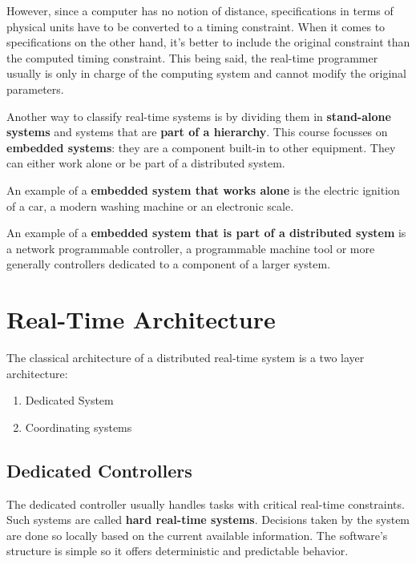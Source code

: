 \documentclass[../main.tex]{subfiles}
\begin{document}
However, since a computer has no notion of distance, specifications in terms of physical units have to be converted to a timing constraint.
When it comes to specifications on the other hand, it's better to include the original constraint than the computed timing constraint.
This being said, the real-time programmer usually is only in charge of the computing system and cannot modify the original parameters.

Another way to classify real-time systems is by dividing them in \textbf{stand-alone systems} and systems that are \textbf{part of a hierarchy}. This course focusses on \textbf{embedded systems}: they are a component built-in to other equipment. They can either work alone or be part of a distributed system.

\begin{exmp}
An example of a \textbf{embedded system that works alone} is the electric ignition of a car, a modern washing machine or an electronic scale.
\end{exmp} 

\begin{exmp}
An example of a \textbf{embedded system that is part of a distributed system} is a network programmable controller, a programmable machine tool or more generally controllers dedicated to a component of a larger system.
\end{exmp} 


\section{Real-Time Architecture}
The classical architecture of a distributed real-time system is a two layer architecture:
\begin{enumerate}
	\item Dedicated System
	\item Coordinating systems
\end{enumerate}

\subsection{Dedicated Controllers}
The dedicated controller usually handles tasks with critical real-time constraints. Such systems are called \textbf{hard real-time systems}. Decisions taken by the system are done so locally based on the current available information. The software's structure is simple so it offers deterministic and predictable behavior. 
 
\end{document}

